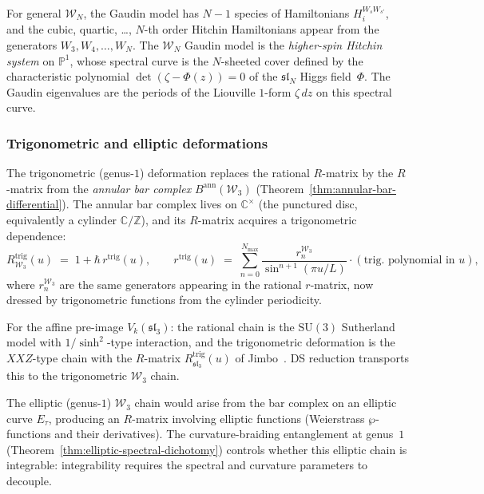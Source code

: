 \begin{remark}%
\label{rem:wn-gaudin}%
%
%
For general $\mathcal{W}_N$, the Gaudin model has $N - 1$
species of Hamiltonians $H_i^{W_s W_{s'}}$, and the cubic,
quartic, \ldots, $N$-th order Hitchin Hamiltonians appear
from the generators $W_3, W_4, \ldots, W_N$. The
$\mathcal{W}_N$ Gaudin model is the
\emph{higher-spin Hitchin system} on $\mathbb{P}^1$,
whose spectral curve is the $N$-sheeted cover defined by
the characteristic polynomial $\det(\zeta - \Phi(z)) = 0$
of the $\mathfrak{sl}_N$ Higgs field~$\Phi$. The Gaudin
eigenvalues are the periods of the Liouville $1$-form
$\zeta\, dz$ on this spectral curve.
\end{remark}

\subsubsection{Trigonometric and elliptic deformations}

\begin{construction}
\label{constr:w3-trig-chain}
%
The trigonometric (genus-$1$) deformation replaces the rational
$R$-matrix by the $R$-matrix from the \emph{annular bar
complex} $B^{\mathrm{ann}}(\mathcal{W}_3)$
(Theorem~\ref{thm:annular-bar-differential}).
The annular bar complex lives on $\mathbb{C}^\times$ (the
punctured disc, equivalently a cylinder $\mathbb{C}/\mathbb{Z}$),
and its $R$-matrix acquires a trigonometric dependence:
\begin{equation}
\label{eq:w3-trig-r-matrix}
R^{\mathrm{trig}}_{\mathcal{W}_3}(u)
\;=\;
1 + \hbar\, r^{\mathrm{trig}}(u),
\qquad
r^{\mathrm{trig}}(u)
\;=\;
\sum_{n=0}^{N_{\max}}
\frac{r_n^{\mathcal{W}_3}}{\sin^{n+1}(\pi u/L)}
\cdot (\text{trig.\ polynomial in } u),
\end{equation}
where $r_n^{\mathcal{W}_3}$ are the same generators appearing
in the rational $r$-matrix, now dressed by trigonometric
functions from the cylinder periodicity.

For the affine pre-image $V_k(\mathfrak{sl}_3)$: the
rational chain is the $\mathrm{SU}(3)$ Sutherland model with
$1/\sinh^2$-type interaction, and the trigonometric deformation
is the $XXZ$-type chain with the
$R$-matrix $R^{\mathrm{trig}}_{\mathfrak{sl}_3}(u)$ of
Jimbo~\cite{Jim86}. DS reduction transports this to the
trigonometric $\mathcal{W}_3$ chain.

The elliptic (genus-$1$) $\mathcal{W}_3$ chain would arise
from the bar complex on an elliptic curve $E_\tau$, producing
an $R$-matrix involving elliptic functions (Weierstrass
$\wp$-functions and their derivatives). The
curvature-braiding entanglement at genus~$1$
(Theorem~\ref{thm:elliptic-spectral-dichotomy})
controls whether this elliptic chain is integrable:
integrability requires the spectral and curvature
parameters to decouple.
\end{construction}

